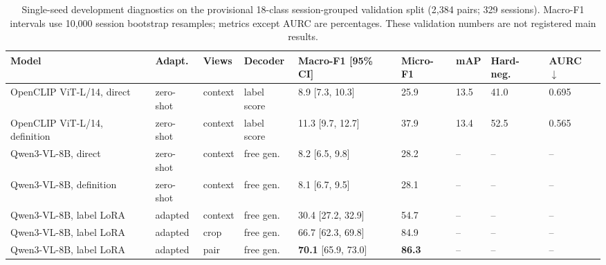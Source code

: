 \begin{table}[t]
\centering
\caption{Single-seed development diagnostics on the provisional 18-class session-grouped validation split (2,384 pairs; 329 sessions). Macro-F1 intervals use 10,000 session bootstrap resamples; metrics except AURC are percentages. These validation numbers are not registered main results.}
\label{tab:development_free}
\footnotesize
\begin{tabularx}{\textwidth}{@{}Y l l l C{2.15cm} C{1.2cm} C{1.05cm} C{1.15cm} C{0.9cm}@{}}
\toprule
Model & Adapt. & Views & Decoder & Macro-F1 [95\% CI] & Micro-F1 & mAP & Hard-neg. & AURC $\downarrow$ \\
\midrule
OpenCLIP ViT-L/14, direct & zero-shot & context & label score & 8.9 [7.3, 10.3] & 25.9 & 13.5 & 41.0 & 0.695 \\
OpenCLIP ViT-L/14, definition & zero-shot & context & label score & 11.3 [9.7, 12.7] & 37.9 & 13.4 & 52.5 & 0.565 \\
Qwen3-VL-8B, direct & zero-shot & context & free gen. & 8.2 [6.5, 9.8] & 28.2 & -- & -- & -- \\
Qwen3-VL-8B, definition & zero-shot & context & free gen. & 8.1 [6.7, 9.5] & 28.1 & -- & -- & -- \\
\midrule
Qwen3-VL-8B, label LoRA & adapted & context & free gen. & 30.4 [27.2, 32.9] & 54.7 & -- & -- & -- \\
Qwen3-VL-8B, label LoRA & adapted & crop & free gen. & 66.7 [62.3, 69.8] & 84.9 & -- & -- & -- \\
Qwen3-VL-8B, label LoRA & adapted & pair & free gen. & \textbf{70.1} [65.9, 73.0] & \textbf{86.3} & -- & -- & -- \\
\bottomrule
\end{tabularx}
\end{table}

